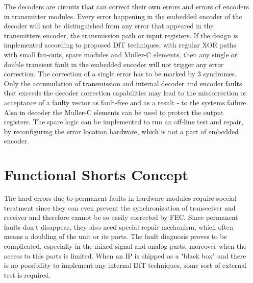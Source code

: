 The decoders are circuits that can correct their own errors and errors of encoders in transmitter modules. Every error happening in the embedded encoder of the decoder will not be distinguished from any error that appeared in the transmitters encoder, the transmission path or input registers. If the design is implemented according to proposed DfT techniques, with regular XOR paths with small fan-outs, spare modules and Muller-C elements, then any single or double transient fault in the embedded encoder will not trigger any error correction. The correction of a single error has to be marked by 3 syndromes. Only the accumulation of transmission and internal decoder and encoder faults that exceeds the decoder correction capabilities may lead to the miscorrection or acceptance of a faulty vector as fault-free and as a result - to the systems failure. Also in decoder the Muller-C elements can be used to protect the output registers. The spare logic can be implemented to run an off-line test and repair, by reconfiguring the error location hardware, which is not a part of embedded encoder\cite{art:Dicorato}.

\section{Functional Shorts Concept}\label{sec:shorts}
The hard errors due to permanent faults in hardware modules require special treatment since they can even prevent the synchronization of transceiver and receiver and therefore cannot be so easily corrected by FEC. Since permanent faults don't disappear, they also need special repair mechanism, which often means a doubling of the unit or its parts. The fault diagnosis proves to be complicated, especially in the mixed signal and analog parts, moreover when the access to this parts is limited. When an IP is shipped as a "black box" and there is no possibility to implement any internal DfT techniques, some sort of external test is required. 


